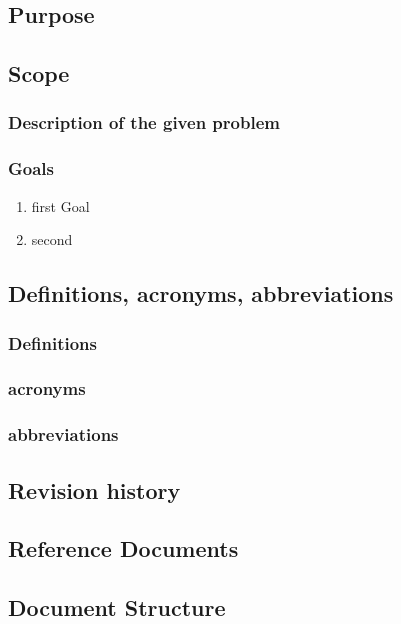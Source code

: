 

\subsection{Purpose}


\subsection{Scope}
\subsubsection{Description of the given problem}
\subsubsection{Goals}
\begin{enumerate}[label=E]
  \item first Goal
  \item second
\end{enumerate}



\subsection{Definitions,  acronyms,  abbreviations}
\subsubsection{Definitions}
\subsubsection{acronyms}
\subsubsection{abbreviations}


\subsection{Revision history}


\subsection{Reference Documents}


\subsection{Document Structure}
